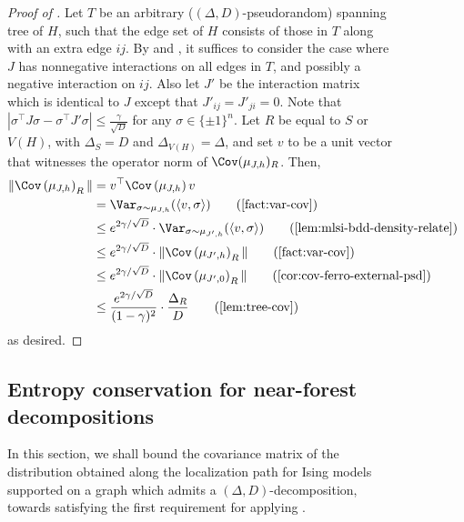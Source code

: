 \documentclass[11pt,letterpaper]{article}
\begin{document}
\begin{figure}
\begin{proof}[Proof of ]
        Let $T$ be an arbitrary ($(\Delta,D)$-pseudorandom) spanning tree of $H$, such that the edge set of $H$ consists of those in $T$ along with an extra edge $ij$. By  and , it suffices to consider the case where $J$ has nonnegative interactions on all edges in $T$, and possibly a negative interaction on $ij$. Also let $J'$ be the interaction matrix which is identical to $J$ except that $J'_{ij} =J'_{ji} = 0$. Note that $\left|\sigma^\top J \sigma - \sigma^\top J' \sigma\right| \le \frac{\gamma}{\sqrt{D}}$ for any $\sigma \in \{\pm 1\}^n$. Let $R$ be equal to $S$ or $V(H)$, with $\Delta_S = D$ and $\Delta_{V(H)} = \Delta$, and set $v$ to be a unit vector that witnesses the operator norm of $\Cov(\mu_{J,h})_{R}$. Then,
        \begin{align*}
            \|\Cov\left( \mu_{J,h} \right)_R\| &= v^\top \Cov\left( \mu_{J,h} \right) v  \\
            &= \Var_{\sigma \sim \mu_{J,h}}(\langle v,\sigma\rangle) \tag*{(\text{\Cref{fact:var-cov}})} \\
            &\le e^{2\gamma/\sqrt{D}} \cdot \Var_{\sigma \sim \mu_{J',h}} (\langle v,\sigma\rangle) \tag*{(\text{\Cref{lem:mlsi-bdd-density-relate}})} \\
            &\le e^{2\gamma/\sqrt{D}} \cdot \| \Cov\left( \mu_{J',h} \right)_R \| \tag*{(\text{\Cref{fact:var-cov}})} \\
            &\le e^{2\gamma/\sqrt{D}} \cdot \| \Cov\left( \mu_{J',0} \right)_R \| \tag*{(\text{\Cref{cor:cov-ferro-external-psd}})} \\
            &\le \frac{e^{2\gamma/\sqrt{D}}}{(1-\gamma)^2} \cdot \frac{\Delta_R}{D} \tag*{(\text{\Cref{lem:tree-cov}})}
        \end{align*}
        as desired.
    \end{proof}

\subsection{Entropy conservation for near-forest decompositions}
\label{sec:entropy-conservation-spinglass}
 
    In this section, we shall bound the covariance matrix of the distribution obtained along the localization path for Ising models supported on a graph which admits a $(\Delta, D)$-decomposition, towards satisfying the first requirement for applying . 


\end{figure}
\end{document}
